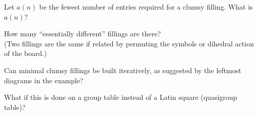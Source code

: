 \documentclass{article}
\begin{document}
\begin{question}
  Let $a(n)$ be the fewest number of entries required for a clumsy filling.
  What is $a(n)$?
\end{question}

\begin{related}
  \item How many ``essentially different'' fillings are there? \\
  (Two fillings are the same if related by permuting the symbols or
  dihedral action of the board.)
  \item Can minimal clumsy fillings be built iteratively, as suggested by the
  leftmost diagrams in the example?
  \item What if this is done on a group table instead of a Latin square
  (quasigroup table)?
\end{related}
\end{document}
